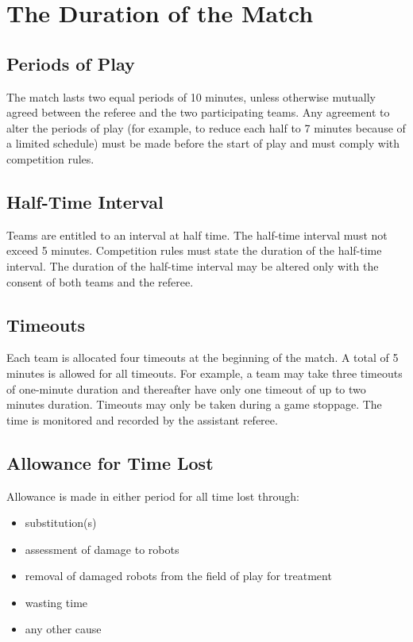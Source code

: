\section{The Duration of the Match}\label{sec:duration-of-the-match}

\subsection{Periods of Play}
The match lasts two equal periods of 10 minutes, unless otherwise mutually agreed between the referee and the two participating teams.
Any agreement to alter the periods of play (for example, to reduce each half to 7 minutes because of a limited schedule) must be made before the start of play and must comply with competition rules.

\subsection{Half-Time Interval}
Teams are entitled to an interval at half time.
The half-time interval must not exceed 5 minutes.
Competition rules must state the duration of the half-time interval.
The duration of the half-time interval may be altered only with the consent of both teams and the referee.

\subsection{Timeouts}\label{subsec:duration-of-the-match-timeouts}
Each team is allocated four timeouts at the beginning of the match.
A total of 5 minutes is allowed for all timeouts.
For example, a team may take three timeouts of one-minute duration and thereafter have only one timeout of up to two minutes duration.
Timeouts may only be taken during a game stoppage.
The time is monitored and recorded by the assistant referee.


\subsection{Allowance for Time Lost}
Allowance is made in either period for all time lost through:

\begin{itemize}
\item substitution(s)
\item assessment of damage to robots
\item removal of damaged robots from the field of play for treatment
\item wasting time
\item any other cause
\end{itemize}

